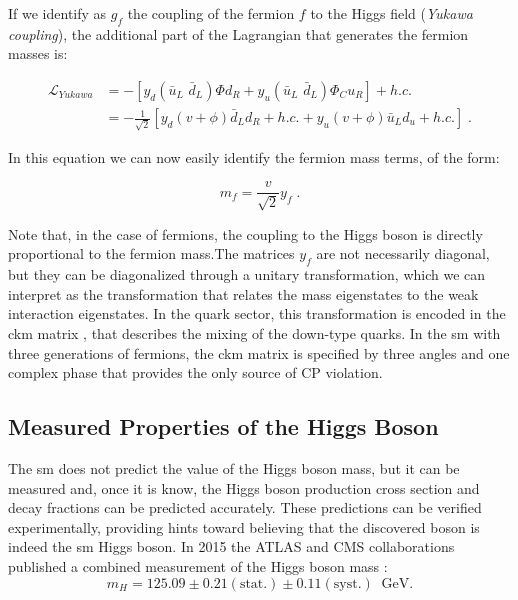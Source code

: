 \noindent If we identify as $g_f$ the coupling of the fermion $f$ to the Higgs field (\textit{Yukawa coupling}), the additional part of the Lagrangian that generates the fermion masses is:

\begin{equation}
\begin{aligned}
\mathcal{L}_{Yukawa} &= - \left[  y_d \left( \bar{u}_L \,\, \bar{d}_L  \right) \Phi d_R +  y_u \left( \bar{u}_L \,\, \bar{d}_L  \right) \Phi_C u_R \right] + h.c. \\
&= - \frac{1}{\sqrt{2}} \left[  y_d \left( v + \phi \right) \bar{d}_L d_R + h.c. + y_u \left( v + \phi \right) \bar{u}_L d_u + h.c. \right]  \; .
\end{aligned}
\end{equation}

\noindent In this equation we can now easily identify the fermion mass terms, of the form:

\begin{equation}
m_f =  \frac{v}{\sqrt{2}} y_f \; .
\end{equation}

\noindent Note that, in the case of fermions, the coupling to the Higgs boson is directly proportional to the fermion mass.The matrices $y_f$ are not necessarily diagonal, but they can be diagonalized through a unitary transformation, which we can interpret as the transformation that relates the mass eigenstates to the weak interaction eigenstates. In the quark sector, this transformation is encoded in the \gls{ckm} matrix \cite{Cabibbo:1963yz, Kobayashi:1973fv}, that describes the mixing of the down-type quarks. In the \gls{sm} with three generations of fermions, the \gls{ckm} matrix is specified by three angles and one complex phase that provides the only source of CP violation.

\subsection{Measured Properties of the Higgs Boson}

The \gls{sm} does not predict the value of the Higgs boson mass, but it can be measured and, once it is know, the Higgs boson production cross section and decay fractions can be predicted accurately. These predictions can be verified experimentally, providing hints toward believing that the discovered boson is indeed the \gls{sm} Higgs boson. In 2015 the ATLAS and CMS collaborations published a combined measurement of the Higgs boson mass \cite{Aad:2015zhl}:
\begin{equation}
m_H = 125.09 \pm 0.21 (\mathrm{stat.}) \pm 0.11 (\mathrm{syst.}) \;\; \mathrm{GeV}.
\end{equation}

